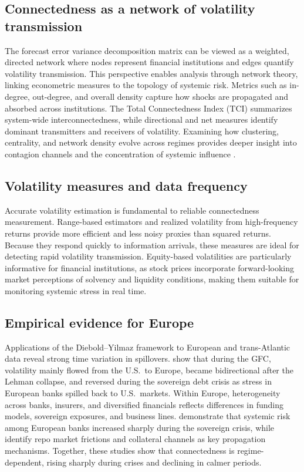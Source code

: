 \subsection{Connectedness as a network of volatility transmission}

The forecast error variance decomposition matrix can be viewed as a weighted, directed
network where nodes represent financial institutions and edges quantify volatility
transmission. This perspective enables analysis through network theory, linking
econometric measures to the topology of systemic risk. Metrics such as in-degree,
out-degree, and overall density capture how shocks are propagated and absorbed across
institutions. The Total Connectedness Index (TCI) summarizes system-wide
interconnectedness, while directional and net measures identify dominant transmitters and
receivers of volatility. Examining how clustering, centrality, and network density evolve
across regimes provides deeper insight into contagion channels and the concentration of
systemic influence \citep{DieboldYilmaz2015}.

\subsection{Volatility measures and data frequency}

Accurate volatility estimation is fundamental to reliable connectedness measurement.
Range-based estimators \citep{AlizadehBrandtDiebold2002} and realized volatility from
high-frequency returns \citep{AndersenBollerslevDieboldLabys2003} provide more efficient
and less noisy proxies than squared returns. Because they respond quickly to information
arrivals, these measures are ideal for detecting rapid volatility transmission.
Equity-based volatilities are particularly informative for financial institutions, as
stock prices incorporate forward-looking market perceptions of solvency and liquidity
conditions, making them suitable for monitoring systemic stress in real time.

\subsection{Empirical evidence for Europe}

Applications of the Diebold--Yilmaz framework to European and trans-Atlantic data reveal
strong time variation in spillovers. \citet{DieboldYilmaz2015TA} show that during the
GFC, volatility mainly flowed from the U.S.\ to Europe, became bidirectional after the
Lehman collapse, and reversed during the sovereign debt crisis as stress in European banks
spilled back to U.S.\ markets. Within Europe, heterogeneity across banks, insurers, and
diversified financials reflects differences in funding models, sovereign exposures, and
business lines. \citet{BlackCorreaHuangZhou2016} demonstrate that systemic risk among
European banks increased sharply during the sovereign crisis, while
\citet{BonaldiHortacsuKastl2015} identify repo market frictions and collateral channels
as key propagation mechanisms. Together, these studies show that connectedness is
regime-dependent, rising sharply during crises and declining in calmer periods.

